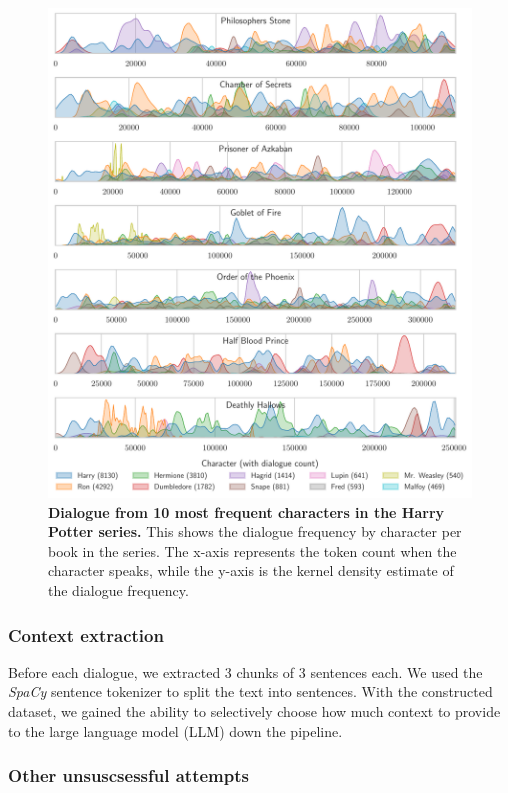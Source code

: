 \documentclass[fleqn,moreauthors,10pt]{ds_report}
\begin{document}
\begin{figure}[htb]
	\centering
	\includegraphics[width=\linewidth]{hp_dialogue.pdf}
	\caption{\textbf{Dialogue from 10 most frequent characters in the Harry Potter series.} This shows the dialogue frequency by character per book in the series. The x-axis represents the token count when the character speaks, while the y-axis is the kernel density estimate of the dialogue frequency.}
	\label{fig:hp_dialogue}
\end{figure}

\subsubsection*{Context extraction}

Before each dialogue, we extracted 3 chunks of 3 sentences each. We used the \textit{SpaCy} sentence tokenizer to split the text into sentences. With the constructed dataset, we gained the ability to selectively choose how much context to provide to the large language model (LLM) down the pipeline.

\subsubsection*{Other unsuscsessful attempts}
\end{document}
